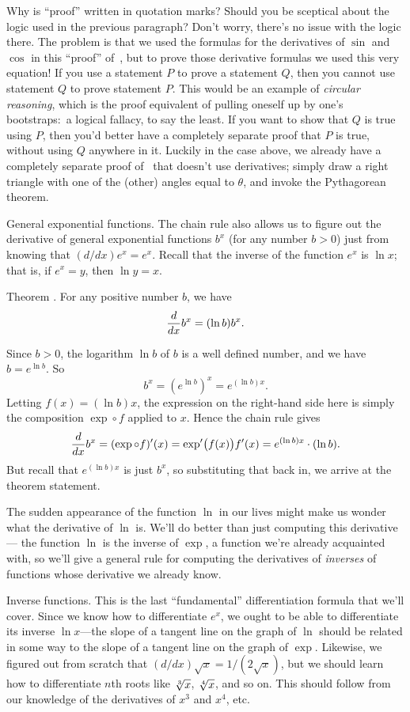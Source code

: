 Why is ``proof'' written in quotation marks? Should you be sceptical about the
logic used in the previous paragraph? Don't worry, there's no issue with the logic there. The problem is
that we used the formulas for the derivatives of $\sin$ and $\cos$ in this ``proof''
of~, but to prove those derivative formulas we used this very equation!
If you use a statement $P$ to prove a statement $Q$, then you cannot use statement $Q$ to prove
statement $P$. This would be an example of {\it circular reasoning}, which is the proof equivalent of
pulling oneself up by one's bootstraps:~a logical fallacy, to say the least. If you want to show that
$Q$ is true using $P$, then you'd better have a completely separate proof that $P$ is true, without
using $Q$ anywhere in it. Luckily in the case above, we already
have a completely separate proof of~ that doesn't use derivatives;
simply draw a right triangle with one of the
(other) angles equal to $\theta$, and invoke the Pythagorean theorem.

\medskip\boldlabel General exponential functions.
The chain rule also allows us to figure out the derivative of general exponential functions $b^x$ (for
any number $b>0$)
just from knowing that $(d/dx) e^x = e^x$. Recall that the inverse of the function $e^x$ is $\ln x$;
that is, if $e^x = y$, then $\ln y = x$.

\proclaim Theorem \advthm. For any positive number $b$, we have
$${d\over dx} b^x = (\ln b) b^x.$$

\proof Since $b>0$, the logarithm $\ln b$ of $b$ is a well defined number,
and we have $b = e^{\ln b}$. So
$$b^x = (e^{\ln b})^x = e^{(\ln b) x}.$$
Letting $f(x) = (\ln b) x$, the expression on the right-hand side here is simply the composition
$\exp\circ f$ applied to $x$. Hence the chain rule gives
$${d\over dx} b^x = (\exp \circ f)'(x) = \exp'\bigr(f(x)\bigr) f'(x) = e^{(\ln b) x} \cdot (\ln b).$$
But recall that $e^{(\ln b)x}$ is just $b^x$, so substituting that back in, we arrive at the theorem
statement.\slug

The sudden appearance of the function $\ln$ in our lives might
make us wonder what the derivative of $\ln$ is. We'll do better than just computing this derivative---
the function $\ln$ is the inverse of $\exp$, a function we're already acquainted with, so we'll
give a general rule for computing the derivatives of {\it inverses} of functions whose derivative
we already know.

\medskip\boldlabel Inverse functions. This is the last ``fundamental'' differentiation formula
that we'll cover.
Since we know how to differentiate $e^x$, we ought to be able to differentiate
its inverse $\ln x$---the slope of a tangent line on the graph of $\ln$ should be related in some way to the
slope of a tangent line on the graph of $\exp$.
Likewise, we figured out from scratch that $(d/dx) \sqrt x = 1/(2\sqrt x)$,
but we should learn how to differentiate $n$th roots like $\root 3\of x$, $\root 4\of x$, and so on. This
should follow from our knowledge of the derivatives of $x^3$ and $x^4$, etc.

